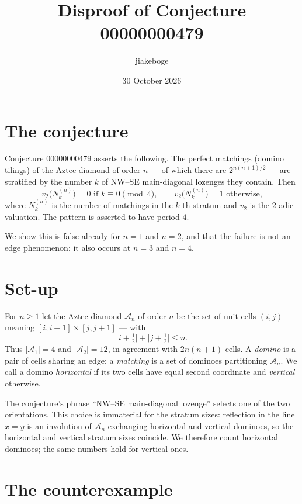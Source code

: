 \documentclass[11pt]{article}
\title{Disproof of Conjecture 00000000479}
\author{jiakeboge}
\date{30 October 2026}
\begin{document}
\maketitle

\section*{The conjecture}

Conjecture 00000000479 asserts the following.  The perfect matchings (domino
tilings) of the Aztec diamond of order $n$ --- of which there are
$2^{n(n+1)/2}$ --- are stratified by the number $k$ of NW--SE main-diagonal
lozenges they contain.  Then
\[
  v_2\bigl(N_k^{(n)}\bigr) = 0 \text{ if } k \equiv 0 \pmod 4,
  \qquad
  v_2\bigl(N_k^{(n)}\bigr) = 1 \text{ otherwise,}
\]
where $N_k^{(n)}$ is the number of matchings in the $k$-th stratum and $v_2$
is the $2$-adic valuation.  The pattern is asserted to have period $4$.

We show this is false already for $n = 1$ and $n = 2$, and that the failure is
not an edge phenomenon: it also occurs at $n = 3$ and $n = 4$.

\section*{Set-up}

For $n \ge 1$ let the Aztec diamond $\mathcal{A}_n$ of order $n$ be the set of
unit cells $(i,j)$ --- meaning $[i,i+1]\times[j,j+1]$ --- with
\[
  \bigl|i + \tfrac12\bigr| + \bigl|j + \tfrac12\bigr| \le n .
\]
Thus $|\mathcal{A}_1| = 4$ and $|\mathcal{A}_2| = 12$, in agreement with
$2n(n+1)$ cells.  A \emph{domino} is a pair of cells sharing an edge; a
\emph{matching} is a set of dominoes partitioning $\mathcal{A}_n$.  We call a
domino \emph{horizontal} if its two cells have equal second coordinate and
\emph{vertical} otherwise.

The conjecture's phrase ``NW--SE main-diagonal lozenge'' selects one of the two
orientations.  This choice is immaterial for the stratum sizes: reflection in
the line $x = y$ is an involution of $\mathcal{A}_n$ exchanging horizontal and
vertical dominoes, so the horizontal and vertical stratum sizes coincide.  We
therefore count horizontal dominoes; the same numbers hold for vertical ones.

\section*{The counterexample}
\end{document}
